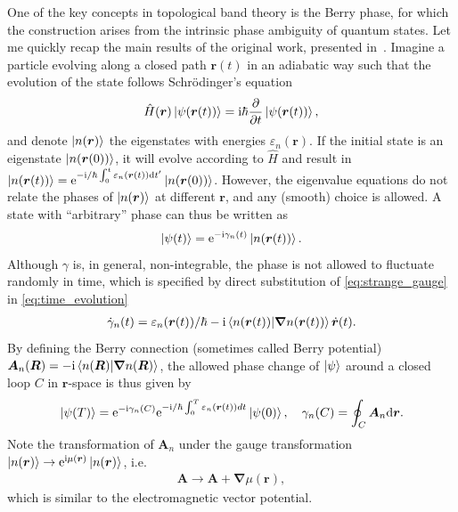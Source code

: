 One of the key concepts in topological band theory is the Berry phase, for which the construction arises from the intrinsic phase ambiguity of quantum states.
Let me quickly recap the main results of the original work, presented in~\cite{Berry1984}.
Imagine a particle evolving along a closed path ${\bm r}(t)$ in an adiabatic way such that the evolution of the state follows Schrödinger's equation
\begin{align}
    \hat H(\bm r)\ket{\psi(\bm r(t))} = \mathrm i\hbar\frac{\partial}{\partial t}\ket{\psi({\bm r(t)})},
    \label{eq:time_evolution}
\end{align}
and denote $\ket{n(\bm r)}$ the eigenstates with energies $\varepsilon_n(\bm r)$.
If the initial state is an eigenstate $\ket{n(\bm r(0))}$, it will evolve according to $\hat H$ and result in $\ket{n(\bm r(t))}=\mathrm e^{-\mathrm i/\hbar\int_0^t \varepsilon_n(\bm r(t))\mathrm d t'}\ket{n(\bm r(0))}$.
However, the eigenvalue equations do not relate the phases of $\ket{n(\bm r)}$ at different $\bm r$, and any (smooth) choice is allowed.
A state with ``arbitrary'' phase can thus be written as
\begin{align}
    \ket{\psi(t)} = \mathrm e^{-\mathrm i\gamma_n(t)}\ket{n(\bm r(t))}.
    \label{eq:strange_gauge}
\end{align}
Although $\gamma$ is, in general, non-integrable, the phase is not allowed to fluctuate randomly in time, which is specified by direct substitution of \cref{eq:strange_gauge} in \cref{eq:time_evolution}
\begin{align}
    \dot\gamma_n(t) = \varepsilon_n(\bm r(t))/\hbar -\mathrm i \braket{n({\bm r(t)})|\bm\nabla n({\bm r(t)})} \dot{\bm r}(t).
    \label{eq:phase_evolution}
\end{align}
By defining the Berry connection (sometimes called Berry potential) $\bm A_n(\bm R) = -\mathrm i \braket{n(\bm R)|\bm\nabla n(\bm R)}$, the allowed phase change of $\ket\psi$ around a closed loop $C$ in $\bm r$-space is thus given by
\begin{align}
    \ket{\psi(T)} = \mathrm e^{-\mathrm i \gamma_n(C)}\mathrm e^{-\mathrm i/\hbar\int_0^T\varepsilon_n(\bm r(t))dt}\ket{\psi(0)},
    \quad
    \gamma_n(C) = \oint_C{\bm A_n}\mathrm d \bm r.
    \label{eq:phase_change}
\end{align}
Note the transformation of $\bm A_n$ under the gauge transformation $\ket{n(\bm r)}\rightarrow\mathrm e^{\mathrm i\mu(\bm r)}\ket{n(\bm r)}$, i.e.
\begin{align}
    \bm A \rightarrow {\bm A} + \bm\nabla\mu(\bm r),
\end{align}
which is similar to the electromagnetic vector potential.
